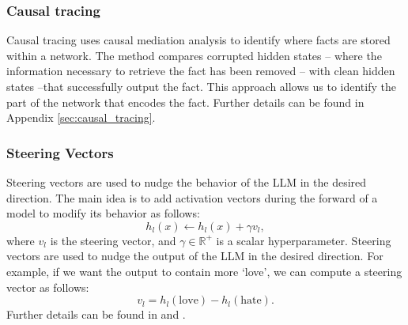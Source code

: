 \subsubsection{Causal tracing} \label{sec:patching}
Causal tracing \citep{meng2022locating, vig2020investigating} uses causal mediation analysis to identify where facts are stored within a network. 
The method compares corrupted hidden states -- where the information necessary to retrieve the fact has been removed -- with clean hidden states --that successfully output the fact. This approach allows us to identify the part of the network that encodes the fact. 
Further details can be found in Appendix \ref{sec:causal_tracing}. 

\subsubsection{Steering Vectors} \label{sec:steering_vec}
Steering vectors \citep{subramani2022extracting, turner2023activation, panickssery2024steeringllama2contrastive} are used to nudge the behavior of the LLM in the desired direction. The main idea is to add activation vectors during the forward of a model to modify its behavior as follows:
\begin{equation}
    h_l(x) \leftarrow h_l(x) + \gamma v_l,
\end{equation}
where $v_l$ is the steering vector, and $\gamma \in \mathbb{R}^{+}$ is a scalar hyperparameter. Steering vectors are used to nudge the output of the LLM in the desired direction. For example, if we want the output to contain more `love', we can compute a steering vector as follows:
\begin{equation}
    v_l = h_l(\text{love}) -  h_l(\text{hate}).
\end{equation}
Further details can be found in \citet{subramani2022extracting} and  \citet{turner2023activation}.
